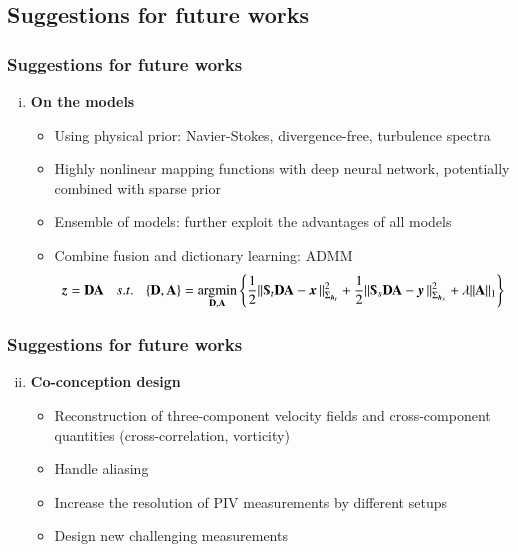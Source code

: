 \documentclass{beamer}
\let\olditem\item
\renewcommand{\item}{\setlength{\itemsep}{\fill}\olditem}
\begin{document}
\subsection[Perspectives]{Suggestions for future works}
\begin{frame}
\frametitle{Suggestions for future works}
\begin{enumerate}[(i)]
	\item \textbf{On the models}
	\begin{itemize}
		\item Using physical prior: Navier-Stokes, divergence-free, turbulence spectra
		\item Highly nonlinear mapping functions with deep neural network, potentially combined with sparse prior
		\item Ensemble of models: further exploit the advantages of all models
		\item Combine fusion and dictionary learning: ADMM 
		\begin{equation*}
			\z = \dict \dictco \:\:\:\: s.t. \:\:\:\: \{\dict,\dictco\} = \argmin_{\dict,\dictco} \left\lbrace \frac{1}{2} \Vert \Sub_t\dict \dictco -\x \Vert^2_{\Sigma_{\h_t}} + \frac{1}{2} \Vert \Sub_s\dict\dictco -\y \Vert^2_{\Sigma_{\h_s}} + \lambda \Vert \dictco \Vert_1 \right\rbrace
		\end{equation*}
	\end{itemize}
\end{enumerate}	
\end{frame}

\begin{frame}
\frametitle{Suggestions for future works}
\begin{enumerate}[(i)]
	\setcounter{enumi}{1}
	\item \textbf{Co-conception design}
	\begin{itemize}
		\item Reconstruction of three-component velocity fields and cross-component quantities (cross-correlation, vorticity)
		\item Handle aliasing
		\item Increase the resolution of PIV measurements by different setups
		\item Design new challenging measurements
	\end{itemize}
\end{enumerate}	
\end{frame}
\end{document}
